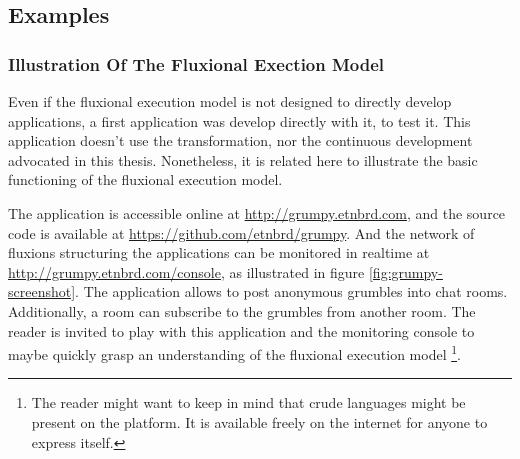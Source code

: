 \subsection{Examples} \label{chapter4:execution-models:examples}

\subsubsection{Illustration Of The Fluxional Exection Model}


Even if the fluxional execution model is not designed to directly develop applications, a first application was develop directly with it, to test it.
This application doesn't use the transformation, nor the continuous development advocated in this thesis.
Nonetheless, it is related here to illustrate the basic functioning of the fluxional execution model.

The application is accessible online at \url{http://grumpy.etnbrd.com}, and the source code is available at \url{https://github.com/etnbrd/grumpy}.
And the network of fluxions structuring the applications can be monitored in realtime at \url{http://grumpy.etnbrd.com/console}, as illustrated in figure \ref{fig:grumpy-screenshot}.
The application allows to post anonymous grumbles into chat rooms.
Additionally, a room can subscribe to the grumbles from another room.
The reader is invited to play with this application and the monitoring console to maybe quickly grasp an understanding of the fluxional execution model \footnote{The reader might want to keep in mind that crude languages might be present on the platform. It is available freely on the internet for anyone to express itself.}.

\begin{figure}
\end{figure}

